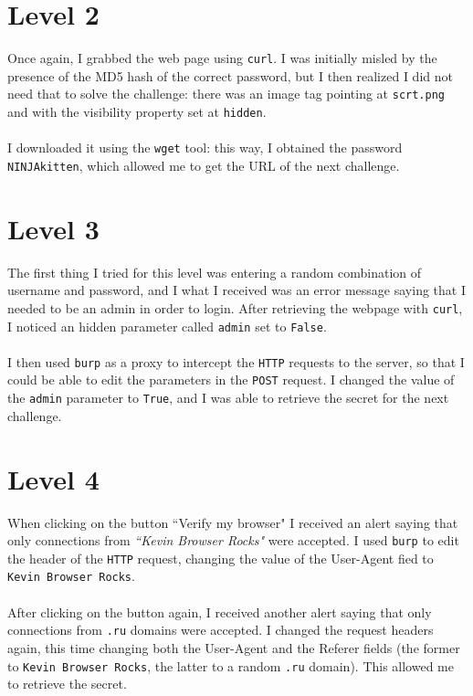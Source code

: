 \documentclass[12pt,a4paper]{article}
\begin{document}
	\section*{Level 2}
	Once again, I grabbed the web page using \texttt{curl}. I was initially misled by the presence of the MD5 hash of the correct password, but I then realized I did not need that to solve the challenge: there was an image tag pointing at \texttt{scrt.png} and with the visibility property set at \texttt{hidden}.\\\\
	I downloaded it using the \texttt{wget} tool: this way, I obtained the password \texttt{NINJAkitten}, which allowed me to get the URL of the next challenge.

	
	\section*{Level 3}
	The first thing I tried for this level was entering a random combination of username and password, and I what I received was an error message saying that I needed to be an admin in order to login. After retrieving the webpage with \texttt{curl}, I noticed an hidden parameter called \texttt{admin} set to \texttt{False}.\\\\ I then used \texttt{burp} as a proxy to intercept the \texttt{HTTP} requests to the server, so that I could be able to edit the parameters in the \texttt{POST} request. I changed the value of the \texttt{admin} parameter to \texttt{True}, and I was able to retrieve the secret for the next challenge.

	\section*{Level 4}
	When clicking on the button ``Verify my browser" I received an alert saying that only connections from \textit{``Kevin Browser Rocks"} were accepted. I used \texttt{burp} to edit the header of the \texttt{HTTP} request, changing the value of the User-Agent fied to \texttt{Kevin Browser Rocks}.\\\\ After clicking on the button again, I received another alert saying that only connections from \texttt{.ru} domains were accepted. I changed the request headers again, this time changing both the User-Agent and the Referer fields (the former to \texttt{Kevin Browser Rocks}, the latter to a random \texttt{.ru} domain). This allowed me to retrieve the secret.
\end{document}

